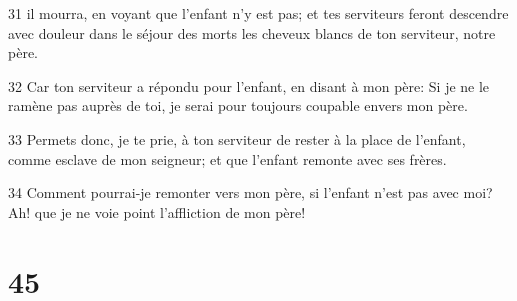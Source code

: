 \par 31 il mourra, en voyant que l'enfant n'y est pas; et tes serviteurs feront descendre avec douleur dans le séjour des morts les cheveux blancs de ton serviteur, notre père.
\par 32 Car ton serviteur a répondu pour l'enfant, en disant à mon père: Si je ne le ramène pas auprès de toi, je serai pour toujours coupable envers mon père.
\par 33 Permets donc, je te prie, à ton serviteur de rester à la place de l'enfant, comme esclave de mon seigneur; et que l'enfant remonte avec ses frères.
\par 34 Comment pourrai-je remonter vers mon père, si l'enfant n'est pas avec moi? Ah! que je ne voie point l'affliction de mon père!

\chapter{45}

